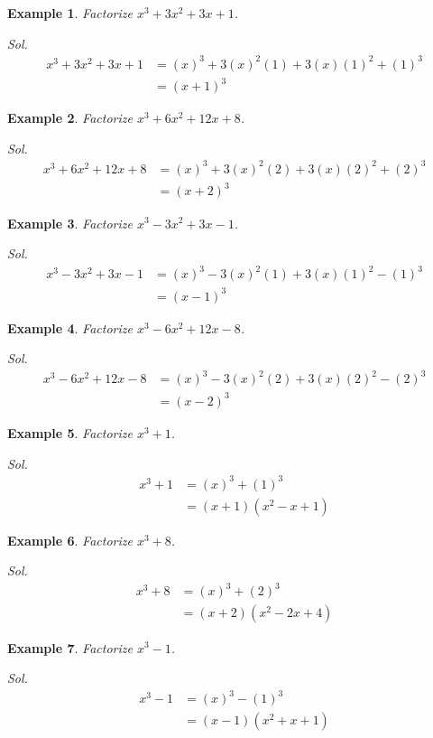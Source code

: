 \documentclass[12pt]{article}
\newtheorem{example}{Example}
\begin{document}
    \begin{example}
        Factorize $x^3+3x^2+3x+1$.
    \end{example}
    \textit{ Sol. }\begin{align*}
        x^3+3x^2+3x+1&=(x)^3+3(x)^2(1)+3(x)(1)^2+(1)^3\\
        &=(x+1)^3
    \end{align*}

    \begin{example}
        Factorize $x^3+6x^2+12x+8$.
    \end{example}
    \textit{ Sol. }\begin{align*}
        x^3+6x^2+12x+8&=(x)^3+3(x)^2(2)+3(x)(2)^2+(2)^3\\
        &=(x+2)^3
    \end{align*}

    \begin{example}
        Factorize $x^3-3x^2+3x-1$.
    \end{example}
    \textit{ Sol. }\begin{align*}
        x^3-3x^2+3x-1&=(x)^3-3(x)^2(1)+3(x)(1)^2-(1)^3\\
        &=(x-1)^3
    \end{align*}

    \begin{example}
        Factorize $x^3-6x^2+12x-8$.
    \end{example}
    \textit{ Sol. }\begin{align*}
        x^3-6x^2+12x-8&=(x)^3-3(x)^2(2)+3(x)(2)^2-(2)^3\\
        &=(x-2)^3
    \end{align*}

    \begin{example}
        Factorize $x^3+1$.
    \end{example}
    \textit{ Sol. }\begin{align*}
        x^3+1&=(x)^3+(1)^3\\
        &=(x+1)(x^2-x+1)
    \end{align*}

    \begin{example}
        Factorize $x^3+8$.
    \end{example}
    \textit{ Sol. }\begin{align*}
        x^3+8&=(x)^3+(2)^3\\
        &=(x+2)(x^2-2x+4)
    \end{align*}

    \begin{example}
        Factorize $x^3-1$.
    \end{example}
    \textit{ Sol. }\begin{align*}
        x^3-1&=(x)^3-(1)^3\\
        &=(x-1)(x^2+x+1)
    \end{align*}
\end{document}

